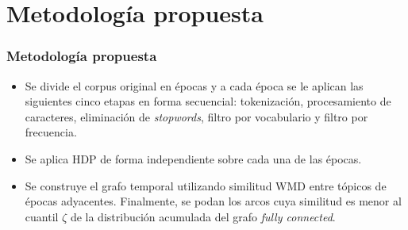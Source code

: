 \documentclass[
	spanish, %
	aspectratio=43, %
	hyperref={pdfencoding=auto,psdextra},
	xcolor={dvipsnames,table,usenames}
]{beamer}
\begin{document}
\section{Metodología propuesta}
\begin{frame}

\frametitle{Metodología propuesta}

\begin{itemize}
  \item Se divide el corpus original en épocas y a cada época se le aplican las siguientes cinco etapas en forma secuencial: tokenización, procesamiento de caracteres, eliminación de \textit{stopwords}, filtro por vocabulario y filtro por frecuencia. 
  \item Se aplica HDP de forma independiente sobre cada una de las épocas. 
  \item Se construye el grafo temporal utilizando similitud WMD entre tópicos de épocas adyacentes. Finalmente, se podan los arcos cuya similitud es menor al cuantil $\zeta$ de la distribución acumulada del grafo \textit{fully connected}.
\end{itemize}



\end{frame}
\end{document}
